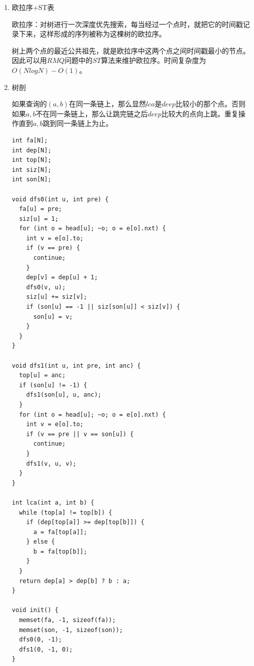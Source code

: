 \documentclass[11pt]{article}
\begin{document}
\begin{enumerate}
\begin{verbatim}
const int N = 100000 + 5;
const int Q = 200000 + 5;

int s[N];
int lca[Q];
vector < pair <int, int> > q[N];

int get(int x) {
  return s[x] == x ? x : s[x] = get(s[x]);
}

void dfs(int u, int pre) {
  col[u] = 1;
  for (int o = head[u]; ~o; o = e[o].nxt) {
    int v = e[o].to;
    if (v == pre) {
      continue;
    }
    dfs(v, u);
    s[v] = u;
  }
  col[u] = 2;
  for (int i = 0; i < q[u].size(); ++i) {
    int v = q[u][i].first;
    if (col[v] == 2) {
      lca[q[u][i].second] = get(v);
    }
  }
}


int main() {
  for (int i = 0; i < n; ++i) {
    s[i] = i;
  }
  for (int i = 0; i < q; ++i) {
    int x = read() - 1;
    int y = read() - 1;
    q[x].push_back(make_pair(y, i));
    q[y].push_back(make_pair(x, i));
  }
  dfs(0, -1);
  return 0;
}
\end{verbatim}
\item 欧拉序+ST表
\label{sec-2-2-2-3}

欧拉序：对树进行一次深度优先搜索，每当经过一个点时，就把它的时间戳记录下来，这样形成的序列被称为这棵树的欧拉序。

树上两个点的最近公共祖先，就是欧拉序中这两个点之间时间戳最小的节点。因此可以用\(RMQ\)问题中的\(ST\)算法来维护欧拉序。时间复杂度为\(O(NlogN)-O(1)\)。

\item 树剖
\label{sec-2-2-2-4}

如果查询的\((a,b)\)在同一条链上，那么显然\(lca\)是\(deep\)比较小的那个点。否则如果\(a,b\)不在同一条链上，那么让跳完链之后\(deep\)比较大的点向上跳。重复操作直到\(a,b\)跳到同一条链上为止。

\begin{verbatim}
int fa[N];
int dep[N];
int top[N];
int siz[N];
int son[N];

void dfs0(int u, int pre) {
  fa[u] = pre;
  siz[u] = 1;
  for (int o = head[u]; ~o; o = e[o].nxt) {
    int v = e[o].to;
    if (v == pre) {
      continue;
    }
    dep[v] = dep[u] + 1;
    dfs0(v, u);
    siz[u] += siz[v];
    if (son[u] == -1 || siz[son[u]] < siz[v]) {
      son[u] = v;
    }
  }
}

void dfs1(int u, int pre, int anc) {
  top[u] = anc;
  if (son[u] != -1) {
    dfs1(son[u], u, anc);
  }
  for (int o = head[u]; ~o; o = e[o].nxt) {
    int v = e[o].to;
    if (v == pre || v == son[u]) {
      continue;
    }
    dfs1(v, u, v);
  }
}

int lca(int a, int b) {
  while (top[a] != top[b]) {
    if (dep[top[a]] >= dep[top[b]]) {
      a = fa[top[a]];
    } else {
      b = fa[top[b]];
    }
  }
  return dep[a] > dep[b] ? b : a;
}

void init() {
  memset(fa, -1, sizeof(fa));
  memset(son, -1, sizeof(son));
  dfs0(0, -1);
  dfs1(0, -1, 0);
}
\end{verbatim}
\end{enumerate}
\end{document}
